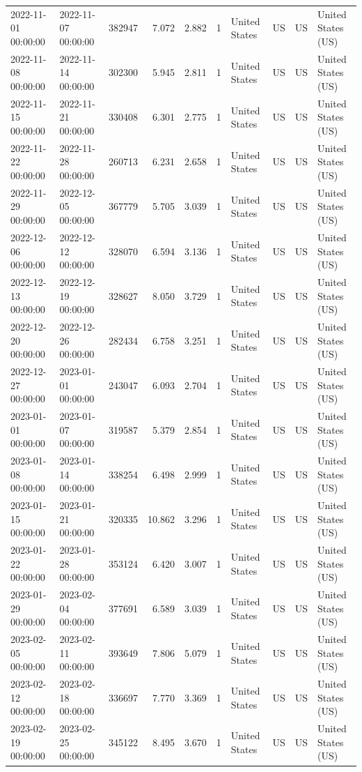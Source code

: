 \begin{tabular}{llrrrlllll}
2022-11-01 00:00:00 & 2022-11-07 00:00:00 & 382947 & 7.072 & 2.882 & 1 & United States & US & US & United States (US) \\
2022-11-08 00:00:00 & 2022-11-14 00:00:00 & 302300 & 5.945 & 2.811 & 1 & United States & US & US & United States (US) \\
2022-11-15 00:00:00 & 2022-11-21 00:00:00 & 330408 & 6.301 & 2.775 & 1 & United States & US & US & United States (US) \\
2022-11-22 00:00:00 & 2022-11-28 00:00:00 & 260713 & 6.231 & 2.658 & 1 & United States & US & US & United States (US) \\
2022-11-29 00:00:00 & 2022-12-05 00:00:00 & 367779 & 5.705 & 3.039 & 1 & United States & US & US & United States (US) \\
2022-12-06 00:00:00 & 2022-12-12 00:00:00 & 328070 & 6.594 & 3.136 & 1 & United States & US & US & United States (US) \\
2022-12-13 00:00:00 & 2022-12-19 00:00:00 & 328627 & 8.050 & 3.729 & 1 & United States & US & US & United States (US) \\
2022-12-20 00:00:00 & 2022-12-26 00:00:00 & 282434 & 6.758 & 3.251 & 1 & United States & US & US & United States (US) \\
2022-12-27 00:00:00 & 2023-01-01 00:00:00 & 243047 & 6.093 & 2.704 & 1 & United States & US & US & United States (US) \\
2023-01-01 00:00:00 & 2023-01-07 00:00:00 & 319587 & 5.379 & 2.854 & 1 & United States & US & US & United States (US) \\
2023-01-08 00:00:00 & 2023-01-14 00:00:00 & 338254 & 6.498 & 2.999 & 1 & United States & US & US & United States (US) \\
2023-01-15 00:00:00 & 2023-01-21 00:00:00 & 320335 & 10.862 & 3.296 & 1 & United States & US & US & United States (US) \\
2023-01-22 00:00:00 & 2023-01-28 00:00:00 & 353124 & 6.420 & 3.007 & 1 & United States & US & US & United States (US) \\
2023-01-29 00:00:00 & 2023-02-04 00:00:00 & 377691 & 6.589 & 3.039 & 1 & United States & US & US & United States (US) \\
2023-02-05 00:00:00 & 2023-02-11 00:00:00 & 393649 & 7.806 & 5.079 & 1 & United States & US & US & United States (US) \\
2023-02-12 00:00:00 & 2023-02-18 00:00:00 & 336697 & 7.770 & 3.369 & 1 & United States & US & US & United States (US) \\
2023-02-19 00:00:00 & 2023-02-25 00:00:00 & 345122 & 8.495 & 3.670 & 1 & United States & US & US & United States (US) \\

\end{tabular}
